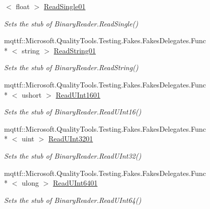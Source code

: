 \begin{DoxyCompactItemize}
$<$ float $>$ \hyperlink{class_system_1_1_i_o_1_1_fakes_1_1_stub_binary_reader_a6c222635b3ebec55b83a4f0a2b39318f}{Read\-Single01}
\begin{DoxyCompactList}\small\item\em Sets the stub of Binary\-Reader.\-Read\-Single()\end{DoxyCompactList}\item 
mqttf\-::\-Microsoft.\-Quality\-Tools.\-Testing.\-Fakes.\-Fakes\-Delegates.\-Func\\*
$<$ string $>$ \hyperlink{class_system_1_1_i_o_1_1_fakes_1_1_stub_binary_reader_a0f889058ac1a087872934262ef0d99f6}{Read\-String01}
\begin{DoxyCompactList}\small\item\em Sets the stub of Binary\-Reader.\-Read\-String()\end{DoxyCompactList}\item 
mqttf\-::\-Microsoft.\-Quality\-Tools.\-Testing.\-Fakes.\-Fakes\-Delegates.\-Func\\*
$<$ ushort $>$ \hyperlink{class_system_1_1_i_o_1_1_fakes_1_1_stub_binary_reader_a9965be48643acce36dd9b4f24f9ddf19}{Read\-U\-Int1601}
\begin{DoxyCompactList}\small\item\em Sets the stub of Binary\-Reader.\-Read\-U\-Int16()\end{DoxyCompactList}\item 
mqttf\-::\-Microsoft.\-Quality\-Tools.\-Testing.\-Fakes.\-Fakes\-Delegates.\-Func\\*
$<$ uint $>$ \hyperlink{class_system_1_1_i_o_1_1_fakes_1_1_stub_binary_reader_abceae04e1d0ec7ebca996e65118969f9}{Read\-U\-Int3201}
\begin{DoxyCompactList}\small\item\em Sets the stub of Binary\-Reader.\-Read\-U\-Int32()\end{DoxyCompactList}\item 
mqttf\-::\-Microsoft.\-Quality\-Tools.\-Testing.\-Fakes.\-Fakes\-Delegates.\-Func\\*
$<$ ulong $>$ \hyperlink{class_system_1_1_i_o_1_1_fakes_1_1_stub_binary_reader_a99152c8803de6c0da7759dd59d53c476}{Read\-U\-Int6401}
\begin{DoxyCompactList}\small\item\em Sets the stub of Binary\-Reader.\-Read\-U\-Int64()\end{DoxyCompactList}\end{DoxyCompactItemize}
